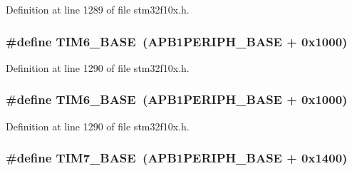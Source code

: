 Definition at line 1289 of file stm32f10x.\+h.

\subsubsection[{\texorpdfstring{T\+I\+M6\+\_\+\+B\+A\+SE}{TIM6_BASE}}]{\setlength{\rightskip}{0pt plus 5cm}\#define T\+I\+M6\+\_\+\+B\+A\+SE~({\bf A\+P\+B1\+P\+E\+R\+I\+P\+H\+\_\+\+B\+A\+SE} + 0x1000)}\hypertarget{group___peripheral__memory__map_ga8268ec947929f192559f28c6bf7d1eac}{}\label{group___peripheral__memory__map_ga8268ec947929f192559f28c6bf7d1eac}


Definition at line 1290 of file stm32f10x.\+h.

\subsubsection[{\texorpdfstring{T\+I\+M6\+\_\+\+B\+A\+SE}{TIM6_BASE}}]{\setlength{\rightskip}{0pt plus 5cm}\#define T\+I\+M6\+\_\+\+B\+A\+SE~({\bf A\+P\+B1\+P\+E\+R\+I\+P\+H\+\_\+\+B\+A\+SE} + 0x1000)}\hypertarget{group___peripheral__memory__map_ga8268ec947929f192559f28c6bf7d1eac}{}\label{group___peripheral__memory__map_ga8268ec947929f192559f28c6bf7d1eac}


Definition at line 1290 of file stm32f10x.\+h.

\subsubsection[{\texorpdfstring{T\+I\+M7\+\_\+\+B\+A\+SE}{TIM7_BASE}}]{\setlength{\rightskip}{0pt plus 5cm}\#define T\+I\+M7\+\_\+\+B\+A\+SE~({\bf A\+P\+B1\+P\+E\+R\+I\+P\+H\+\_\+\+B\+A\+SE} + 0x1400)}\hypertarget{group___peripheral__memory__map_ga0ebf54364c6a2be6eb19ded6b18b6387}{}\label{group___peripheral__memory__map_ga0ebf54364c6a2be6eb19ded6b18b6387}


